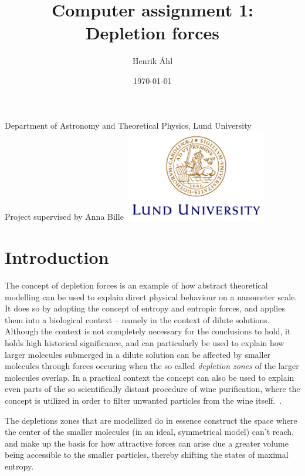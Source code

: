 \documentclass[a4paper,12pt]{article}
\title
{
	\textbf
	{
      Computer assignment 1: \\
      Depletion forces
   }
}
\author{Henrik Åhl}
\date{\today}
\theoremstyle{plain}
\theoremstyle{definition}
\begin{document}
\begin{titlepage}
	
   \maketitle 
	\begin{center}
		\phantom{a}
		{Department of Astronomy and Theoretical Physics, Lund University}
		\\[2cm]
		{Project supervised by Anna Bille}
		\vfill
		\includegraphics[height=4cm]{logocLUeng.pdf}
	\end{center}
	\thispagestyle{empty} %
\end{titlepage}
\section{Introduction}
   The concept of depletion forces is an example of how abstract theoretical modelling
   can be used to explain direct physical behaviour on a nanometer scale. It does so by 
   adopting the concept of entropy and entropic forces, and applies them into a biological
   context -- namely in the context of dilute solutions. Although the context is
   not completely necessary for the conclusions to hold, it holds high
   historical significance, and can particularly be used to explain how larger molecules
   submerged in a dilute solution can be affected by smaller molecules through forces 
   occuring when the so called \textit{depletion zones} of the larger
   molecules overlap. In a practical context the concept can also be used to explain even 
   parts of the so scientifically distant procedure of wine purification, where the concept is 
   utilized in order to filter unwanted particles from the wine itself.~\cite{wine}.
   
   The depletions zones that are modellized do in essence construct the space where the
   center of the smaller molecules (in an ideal, symmetrical model) can't reach, and make 
   up the basis for how attractive forces can arise due a greater volume being
   accessible to the smaller particles, thereby shifting the states of maximal
   entropy.~\cite{lecnotes}
\end{document}
